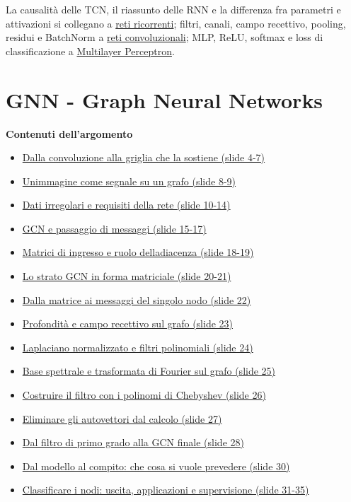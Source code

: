 \documentclass[11pt,a4paper,oneside,openany]{book}
\newenvironment{indiceargomento}{\begingroup\small\sffamily\color{grigio}\textbf{Contenuti dell'argomento}\par\begin{itemize}\setlength{\itemsep}{0pt}\setlength{\parskip}{0pt}}{\end{itemize}\endgroup\medskip}
\begin{document}
La causalità delle TCN, il riassunto delle RNN e la differenza fra parametri e attivazioni si collegano a \hyperref[fonte03]{reti ricorrenti}; filtri, canali, campo recettivo, pooling, residui e BatchNorm a \hyperref[fonte02]{reti convoluzionali}; MLP, ReLU, softmax e loss di classificazione a \hyperref[fonte01]{Multilayer Perceptron}.


\chapter{GNN - Graph Neural Networks}\label{fonte05}

\begin{indiceargomento}
\item \hyperref[f05-r18]{Dalla convoluzione alla griglia che la sostiene (slide 4-7)}
\item \hyperref[f05-r49]{Un\textquotesingle immagine come segnale su un grafo (slide 8-9)}
\item \hyperref[f05-r65]{Dati irregolari e requisiti della rete (slide 10-14)}
\item \hyperref[f05-r102]{GCN e passaggio di messaggi (slide 15-17)}
\item \hyperref[f05-r119]{Matrici di ingresso e ruolo dell\textquotesingle adiacenza (slide 18-19)}
\item \hyperref[f05-r150]{Lo strato GCN in forma matriciale (slide 20-21)}
\item \hyperref[f05-r198]{Dalla matrice ai messaggi del singolo nodo (slide 22)}
\item \hyperref[f05-r282]{Profondità e campo recettivo sul grafo (slide 23)}
\item \hyperref[f05-r298]{Laplaciano normalizzato e filtri polinomiali (slide 24)}
\item \hyperref[f05-r335]{Base spettrale e trasformata di Fourier sul grafo (slide 25)}
\item \hyperref[f05-r403]{Costruire il filtro con i polinomi di Chebyshev (slide 26)}
\item \hyperref[f05-r439]{Eliminare gli autovettori dal calcolo (slide 27)}
\item \hyperref[f05-r494]{Dal filtro di primo grado alla GCN finale (slide 28)}
\item \hyperref[f05-n30-r558]{Dal modello al compito: che cosa si vuole prevedere (slide 30)}
\item \hyperref[f05-n30-r579]{Classificare i nodi: uscita, applicazioni e supervisione (slide 31-35)}

\end{indiceargomento}
\end{document}
